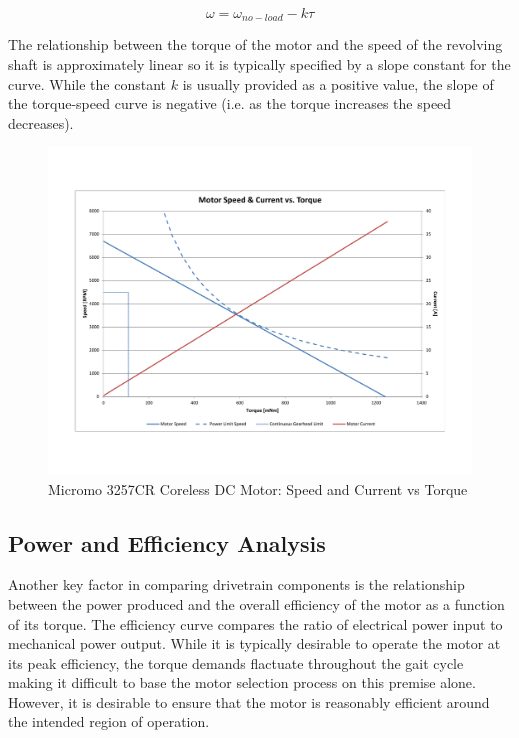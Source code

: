 \begin{equation}
	\omega = \omega_{no-load} - k\tau
\end{equation}

The relationship between the torque of the motor and the speed of the revolving shaft is approximately linear so it is typically specified by a slope constant for the curve. While the constant $k$ is usually provided as a positive value, the slope of the torque-speed curve is negative (i.e. as the torque increases the speed decreases). 

\begin{figure}[!ht]
	\begin{center}
    \includegraphics[trim = 20mm 30mm 20mm 30mm,clip,width=15cm]{fig/design/motor1.pdf}
	\end{center}
  \caption{Micromo 3257CR Coreless DC Motor: Speed and Current vs Torque}
\end{figure}


\subsection{Power and Efficiency Analysis} %
\label{sub:power_and_efficiency_analysis}
Another key factor in comparing drivetrain components is the relationship between the power produced and the overall efficiency of the motor as a function of its torque. The efficiency curve compares the ratio of electrical power input to mechanical power output. While it is typically desirable to operate the motor at its peak efficiency, the torque demands flactuate throughout the gait cycle making it difficult to base the motor selection process on this premise alone. However, it is desirable to ensure that the motor is reasonably efficient around the intended region of operation. 

